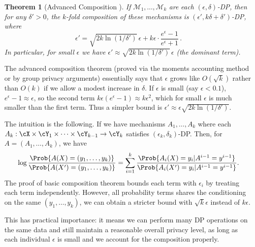\documentclass[11pt, a4paper]{article}
\newtheorem{theorem}{Theorem}
\begin{document}
\begin{theorem}[Advanced Composition \cite{DworkRoth2014}]
If $\mathcal{M}_1, \dots, \mathcal{M}_k$ are each $(\epsilon,\delta)$-DP, then for any $\delta' > 0$, the $k$-fold composition of these mechanisms is $(\epsilon', k\delta + \delta')$-DP, where 
\[ \epsilon' = \sqrt{2k \ln(1/\delta')} \,\epsilon + k\epsilon \cdot \frac{e^\epsilon - 1}{e^\epsilon+1}\,. \] 
In particular, for small $\epsilon$ we have $\epsilon' \approx \sqrt{2k \ln(1/\delta')} \,\epsilon$ (the dominant term).
\end{theorem}

The advanced composition theorem (proved via the moments accounting method or by group privacy arguments)
essentially says that $\epsilon$ grows like $O(\sqrt{k})$ rather than $O(k)$ if we allow a modest increase in $\delta$.
If $\epsilon$ is small (say $\epsilon < 0.1$), $e^\epsilon - 1 \approx \epsilon$,
so the second term $k\epsilon(e^\epsilon-1) \approx k\epsilon^2$, which for small $\epsilon$ is much smaller than the first term.
Thus a simpler bound is $\epsilon' \approx \epsilon\sqrt{2k \ln(1/\delta')}$.

The intuition is the following.
If we have mechanisms $A_1, \dots, A_k$ where each $A_k:\cX \times \cY_1\times \cdots \times \cY_{k-1}\rightarrow \cY_k$ 
satisfies $(\epsilon_k, \delta_k)$-DP.
Then, for $A = (A_1, \dots, A_k)$, we have
\begin{align*}
    \log \frac{\Prob{A(X) = (y_1, \dots, y_k)}}{\Prob{A(X') = (y_1, \dots, y_k)}}
    = \sum_{i=1}^k \frac{\Prob{A_i(X)=y_i | A^{i-1}=y^{i-1}}}{\Prob{A_i(X')=y_i | A^{i-1}=y^{i-1}}}.
\end{align*}
The proof of basic composition theorem bounds each term with $\epsilon_i$ by treating each term independently.
However, all probability terms shares the conditioning on the same $(y_1, \dots, y_k)$, 
we can obtain a stricter bound with $\sqrt{k}\epsilon$ instead of $k\epsilon$.

This has practical importance: it means we can perform many DP operations on the same data 
and still maintain a reasonable overall privacy level,
as long as each individual $\epsilon$ is small and we account for the composition properly.



\end{document}
